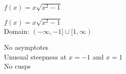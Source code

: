 {$f(x) = x \sqrt{x^2-1}$}
{$f(x) = x\sqrt{x^2-1}$\\
Domain: $(-\infty, -1] \cup [1,\infty)$\\
\begin{center}
\end{center}

No asymptotes\\
Unusual steepness at $x = -1$ and $x = 1$\\
No cusps\\

\begin{center}
\end{center}}



